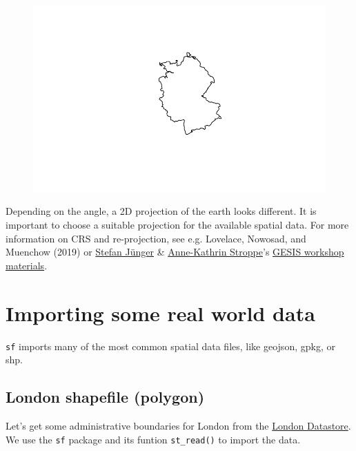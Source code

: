 \documentclass[
  letterpaper,
  DIV=11,
  numbers=noendperiod]{scrreprt}
\begin{document}
\begin{figure}[H]

{\centering \includegraphics{01_refresher_short_files/figure-pdf/unnamed-chunk-5-2.pdf}

}

\end{figure}

Depending on the angle, a 2D projection of the earth looks different. It
is important to choose a suitable projection for the available spatial
data. For more information on CRS and re-projection, see e.g. Lovelace,
Nowosad, and Muenchow (2019) or
\href{https://stefanjuenger.github.io/}{Stefan Jünger} \&
\href{https://www.gesis.org/institut/mitarbeitendenverzeichnis/person/Anne-Kathrin.Stroppe}{Anne-Kathrin
Stroppe}'s
\href{https://github.com/StefanJuenger/gesis-workshop-geospatial-techniques-R-2023}{GESIS
workshop materials}.

\hypertarget{importing-some-real-world-data}{%
\section{Importing some real world
data}\label{importing-some-real-world-data}}

\texttt{sf} imports many of the most common spatial data files, like
geojson, gpkg, or shp.

\hypertarget{london-shapefile-polygon}{%
\subsection{London shapefile (polygon)}\label{london-shapefile-polygon}}

Let's get some administrative boundaries for London from the
\href{https://data.london.gov.uk/dataset/statistical-gis-boundary-files-london}{London
Datastore}. We use the \texttt{sf} package and its funtion
\texttt{st\_read()} to import the data.
\end{document}
